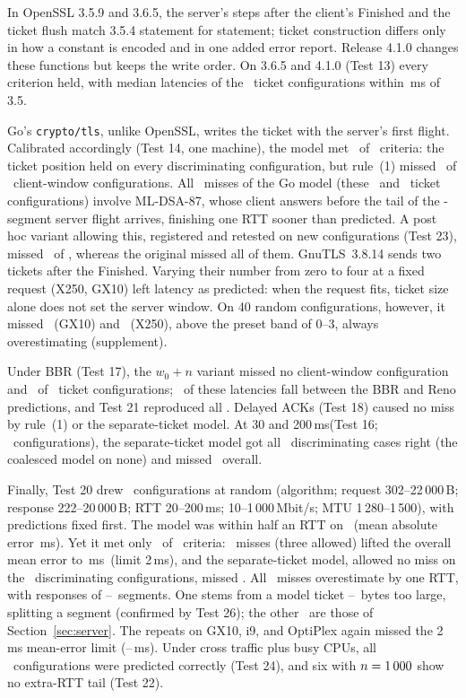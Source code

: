 \documentclass[sigconf,9pt,nonacm]{acmart}
\newcommand{\ms}{\,ms\xspace}
\begin{document}
In OpenSSL 3.5.9 and 3.6.5, the server's steps after the client's Finished and the ticket flush match 3.5.4 statement for statement; ticket construction differs only in how a constant is encoded and in one added error report. Release 4.1.0 changes these functions but keeps the write order. On 3.6.5 and 4.1.0 (Test 13) every criterion held, with median latencies of the \DN\ ticket configurations within \GxMaxDiff\ms of 3.5.

Go's \texttt{crypto/tls}, unlike OpenSSL, writes the ticket with the server's first flight. Calibrated accordingly (Test 14, one machine), the model met \GoMet\ of \GoK\ criteria: the ticket position held on every discriminating configuration, but rule~(1) missed \GoCWrong\ of \GoCN\ client-window configurations. All \GoWrongSuiteN\ misses of the Go model (these \GoCWrong\ and \GoWrongAll\ ticket configurations) involve ML-DSA-87, whose client answers before the tail of the \GoSrvMlEightSeven-segment server flight arrives, finishing one RTT sooner than predicted. A post hoc variant allowing this, registered and retested on new configurations (Test 23), missed \GeighteenWrongPip\ of \GeighteenN, whereas the original missed all of them. GnuTLS~3.8.14 sends two tickets after the Finished. Varying their number from zero to four at a fixed request (X250, GX10) left latency as predicted: when the request fits, ticket size alone does not set the server window. On 40 random configurations, however, it missed \GtlsARWrong\ (GX10) and \GtlsXRWrong\ (X250), above the preset band of 0--3, always overestimating (supplement).

Under BBR (Test 17), the $w_0+n$ variant missed no client-window configuration and \GfBbrDWrong\ of \GfBbrDN\ ticket configurations; \GfMidNW\ of these latencies fall between the BBR and Reno predictions, and Test 21 reproduced all \GfBbrDWrong. Delayed ACKs (Test 18) caused no miss by rule~(1) or the separate-ticket model. At 30 and 200\ms (Test 16; \GtwelveCells\ configurations), the separate-ticket model got all \GtwelveDis\ discriminating cases right (the coalesced model on none) and missed \GtwelveEarlyAll\ overall.

Finally, Test 20 drew \GnineN\ configurations at random (algorithm; request 302--22\,000\,B; response 222--20\,000\,B; RTT 20--200\ms; 10--1\,000\,Mbit/s; MTU 1\,280--1\,500), with predictions fixed first. The model was within half an RTT on \GnineOtherN\ (mean absolute error \GnineMaeOther\ms). Yet it met only \GnineMet\ of \GnineK\ criteria: \GnineWrongW\ misses (three allowed) lifted the overall mean error to \GnineMae\ms\ (limit 2\ms), and the separate-ticket model, allowed no miss on the \GnineDisc\ discriminating configurations, missed \GnineDiscEarlyW. All \GnineWrongW\ misses overestimate by one RTT, with responses of \GnineRespLo--\GnineRespHi\ segments. One stems from a model ticket \TktDiffLo--\TktDiffHi\ bytes too large, splitting a segment (confirmed by Test 26); the other \TktWrongAfterW\ are those of Section~\ref{sec:server}. The repeats on GX10, i9, and OptiPlex again missed the 2\ms mean-error limit (\GnineRepMaeLo--\GnineRepMaeHi\ms). Under cross traffic plus busy CPUs, all \GseventeenCells\ configurations were predicted correctly (Test 24), and six with $n=1\,000$ show no extra-RTT tail (Test 22).
\end{document}
